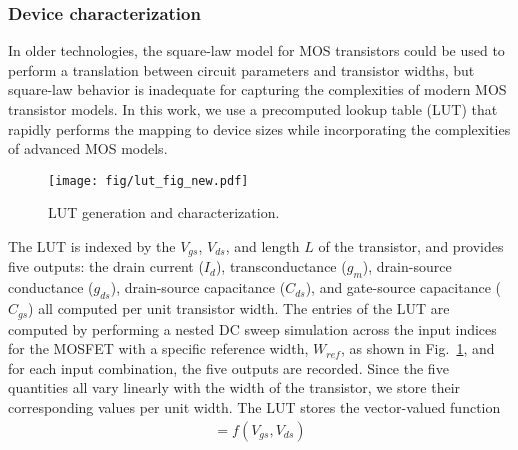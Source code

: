 \subsubsection{\textbf{Device characterization}}

In older technologies, the square-law model for MOS transistors could be used to perform a translation between circuit parameters and transistor widths, but square-law behavior is inadequate for capturing the complexities of modern MOS transistor models. In this work, we use a precomputed lookup table (LUT) that rapidly performs the mapping to device sizes while incorporating the complexities of advanced MOS models.

\begin{figure}[t]
\centering
\texttt{[image: fig/lut\_fig\_new.pdf]}
\caption{LUT generation and characterization.}
\label{fig:lutgen}
\vspace{-5mm}
\end{figure}

The LUT is indexed by the $V_{gs}$, $V_{ds}$, and length $L$ of the transistor, and provides five outputs: the drain current ($I_d$), transconductance ($g_m$), drain-source conductance ($g_{ds}$), drain-source capacitance ($C_{ds}$), and gate-source capacitance ($C_{gs}$) all computed per unit transistor width. The entries of the LUT are computed by performing a nested DC sweep simulation across the input indices for the MOSFET with a specific reference width, $W_{ref}$, as shown in Fig.~\ref{fig:lutgen}, and for each input combination, the five outputs are recorded. Since the five quantities all vary linearly with the width of the transistor, we store their corresponding values per unit width. 
The LUT stores the vector-valued function
\begin{align}
[I_d \;\; g_m \;\; g_{ds} \;\; C_{ds} \;\; C_{gs}] = f(V_{gs}, V_{ds})
\end{align}


